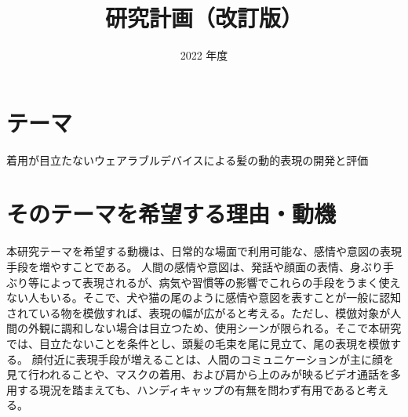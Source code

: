 \documentclass[a4paper]{jsarticle}
\begin{document}
\masterthesis %


\title{研究計画（改訂版）}
\date{2022 年度}
\maketitle


\setcounter{page}{1} %



\newpage

\setcounter{page}{1} %


\section{テーマ}
着用が目立たないウェアラブルデバイスによる髪の動的表現の開発と評価

\section{そのテーマを希望する理由・動機}
本研究テーマを希望する動機は、日常的な場面で利用可能な、感情や意図の表現手段を増やすことである。
人間の感情や意図は、発話や顔面の表情、身ぶり手ぶり等によって表現されるが、病気や習慣等の影響でこれらの手段をうまく使えない人もいる。そこで、犬や猫の尾のように感情や意図を表すことが一般に認知されている物を模倣すれば、表現の幅が広がると考える。ただし、模倣対象が人間の外観に調和しない場合は目立つため、使用シーンが限られる。そこで本研究では、目立たないことを条件とし、頭髪の毛束を尾に見立て、尾の表現を模倣する。
顔付近に表現手段が増えることは、人間のコミュニケーションが主に顔を見て行われることや、マスクの着用、および肩から上のみが映るビデオ通話を多用する現況を踏まえても、ハンディキャップの有無を問わず有用であると考える。
\end{document}

